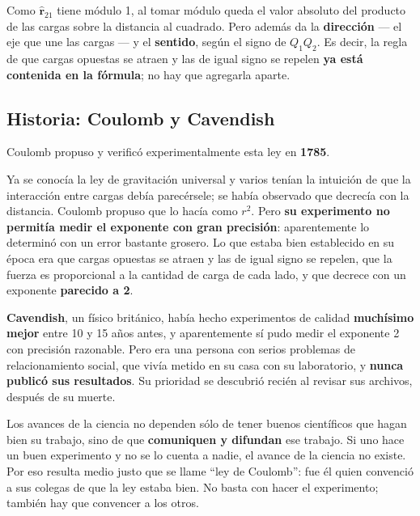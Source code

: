 \documentclass[12pt,a4paper]{article}
\begin{document}


\begin{notebox}
Como $\hat{\mathbf{r}}_{21}$ tiene módulo 1, al tomar módulo queda el valor
absoluto del producto de las cargas sobre la distancia al cuadrado. Pero además da
la \textbf{dirección} --- el eje que une las cargas --- y el \textbf{sentido},
según el signo de $Q_1Q_2$. Es decir, la regla de que cargas opuestas se atraen y
las de igual signo se repelen \textbf{ya está contenida en la fórmula}; no hay que
agregarla aparte.
\end{notebox}

\subsection{Historia: Coulomb y Cavendish}

Coulomb propuso y verificó experimentalmente esta ley en \textbf{1785}.

\begin{warnbox}
Ya se conocía la ley de gravitación universal y varios tenían la intuición de que
la interacción entre cargas debía parecérsele; se había observado que decrecía con
la distancia. Coulomb propuso que lo hacía como $r^2$. Pero \textbf{su experimento
no permitía medir el exponente con gran precisión}: aparentemente lo determinó con
un error bastante grosero. Lo que estaba bien establecido en su época era que
cargas opuestas se atraen y las de igual signo se repelen, que la fuerza es
proporcional a la cantidad de carga de cada lado, y que decrece con un exponente
\textbf{parecido a 2}.
\end{warnbox}

\textbf{Cavendish}, un físico británico, había hecho experimentos de calidad
\textbf{muchísimo mejor} entre 10 y 15 años antes, y aparentemente sí pudo medir
el exponente 2 con precisión razonable. Pero era una persona con serios problemas
de relacionamiento social, que vivía metido en su casa con su laboratorio, y
\textbf{nunca publicó sus resultados}. Su prioridad se descubrió recién al revisar
sus archivos, después de su muerte.

\begin{keybox}[La moraleja]
Los avances de la ciencia no dependen sólo de tener buenos científicos que hagan
bien su trabajo, sino de que \textbf{comuniquen y difundan} ese trabajo. Si uno
hace un buen experimento y no se lo cuenta a nadie, el avance de la ciencia no
existe. Por eso resulta medio justo que se llame \enquote{ley de Coulomb}: fue él
quien convenció a sus colegas de que la ley estaba bien. No basta con hacer el
experimento; también hay que convencer a los otros.
\end{keybox}
\end{document}
